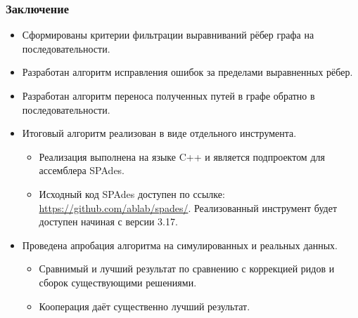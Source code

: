 \documentclass{beamer}
\begin{document}
\begin{frame}\frametitle{Заключение}
\begin{itemize}
    \item Сформированы критерии фильтрации выравниваний рёбер графа на последовательности.
    \item Разработан алгоритм исправления ошибок за пределами выравненных рёбер.
    \item Разработан алгоритм переноса полученных путей в графе обратно в последовательности.
    \item Итоговый алгоритм реализован в виде отдельного инструмента.
    \begin{itemize}
        \item Реализация выполнена на языке C++ и является подпроектом для ассемблера SPAdes.
        \item \begin{sloppypar} Исходный код SPAdes доступен по ссылке: \mbox{\url{https://github.com/ablab/spades/}}. Реализованный инструмент будет доступен начиная с версии 3.17. \end{sloppypar}
    \end{itemize}
    \item Проведена апробация алгоритма на симулированных и реальных данных.
    \begin{itemize}
        \item Сравнимый и лучший результат по сравнению с коррекцией ридов и сборок существующими решениями.
        \item Кооперация даёт существенно лучший результат.
    \end{itemize}

\end{itemize}

\end{frame}

\end{document}
